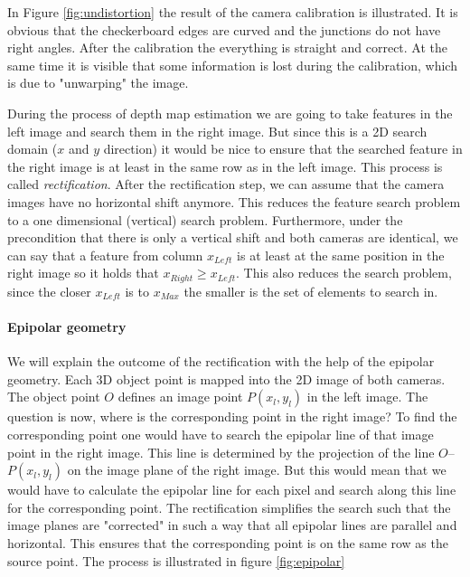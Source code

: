 \documentclass[11pt]{article}
\begin{document}
In Figure \ref{fig:undistortion} the result of the camera calibration is illustrated. It is obvious that the checkerboard edges are curved and the junctions do not have right angles. After the calibration the everything is straight and correct. At the same time it is visible that some information is lost during the calibration, which is due to "unwarping" the image.

\bigskip

During the process of depth map estimation we are going to take features in the left image and search them in the right image. But since this is a 2D search domain ($x$ and $y$ direction) it would be nice to ensure that the searched feature in the right image is at least in the same row as in the left image. This process is called \emph{rectification}. After the rectification step, we can assume that the camera images have no horizontal shift anymore. This reduces the feature search problem to a one dimensional (vertical) search problem. Furthermore, under the precondition that there is only a vertical shift and both cameras are identical, we can say that a feature from column $x_{Left}$ is at least at the same position in the right image so it holds that $x_{Right}\geq x_{Left}$. This also reduces the search problem, since the closer $x_{Left}$ is to $x_{Max}$ the smaller is the set of elements to search in.

\paragraph{Epipolar geometry} We will explain the outcome of the rectification with the help of the epipolar geometry. Each 3D object point is mapped into the 2D image of both cameras. The object point $O$ defines an image point $P(x_l,y_l)$ in the left image. The question is now, where is the corresponding point in the right image? To find the corresponding point one would have to search the epipolar line of that image point in the right image. This line is determined by the projection of the line $O$--$P(x_l,y_l)$ on the image plane of the right image. But this would mean that we would have to calculate the epipolar line for each pixel and search along this line for the corresponding point. The rectification simplifies the search such that the image planes are "corrected" in such a way that all epipolar lines are parallel and horizontal. This ensures that the corresponding point is on the same row as the source point. The process is illustrated in figure \ref{fig:epipolar}
 
\end{document}
